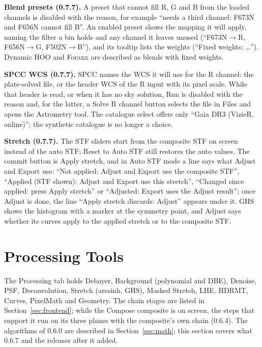 \documentclass[11pt,a4paper]{article}
\begin{document}
    \textbf{Blend presets (0.7.7).} A preset that cannot fill R, G and B from the loaded channels is disabled with the reason, for example ``needs a third channel: F673N and F656N cannot fill B''. An enabled preset shows the mapping it will apply, naming the filter a bin holds and any channel it leaves unused (``F673N$\to$R, F656N$\to$G, F502N$\to$B''), and its tooltip lists the weights (``Fixed weights: \ldots{}''). Dynamic HOO and Foraxx are described as blends with fixed weights.

    \textbf{SPCC WCS (0.7.7).} SPCC names the WCS it will use for the R channel: the plate-solved file, or the header WCS of the R input with its pixel scale. While that header is read, or when it has no sky solution, Run is disabled with the reason and, for the latter, a Solve R channel button selects the file in Files and opens the Astrometry tool. The catalogue select offers only ``Gaia DR3 (VizieR, online)''; the synthetic catalogue is no longer a choice.

    \textbf{Stretch (0.7.7).} The STF sliders start from the composite STF on screen instead of the auto STF; Reset to Auto STF still restores the auto values. The commit button is Apply stretch, and in Auto STF mode a line says what Adjust and Export use: ``Not applied: Adjust and Export use the composite STF'', ``Applied (STF shown): Adjust and Export use this stretch'', ``Changed since applied: press Apply stretch'' or ``Adjusted: Export uses the Adjust result''; once Adjust is done, the line ``Apply stretch discards: Adjust'' appears under it. GHS shows the histogram with a marker at the symmetry point, and Adjust says whether its curves apply to the applied stretch or to the composite STF.

    \section{Processing Tools}
    \label{sec:processing}

    The Processing tab holds Debayer, Background (polynomial and DBE), Denoise, PSF, Deconvolution, Stretch (arcsinh, GHS), Masked Stretch, LHE, HDRMT, Curves, PixelMath and Geometry. The chain stages are listed in Section~\ref{sec:frontend}; while the Compose composite is on screen, the steps that support it run on its three planes with the composite's own chain (0.6.4). The algorithms of 0.6.0 are described in Section~\ref{sec:math}; this section covers what 0.6.7 and the releases after it added.
\end{document}
